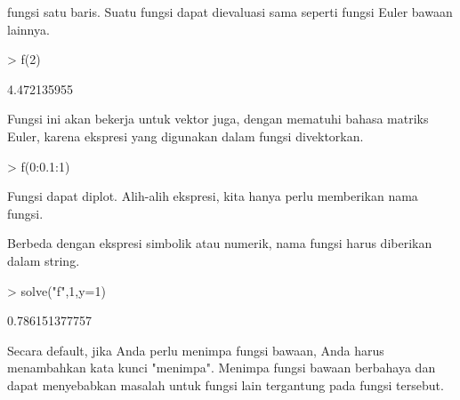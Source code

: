 \documentclass[a4paper,10pt]{article}
\begin{document}
\begin{eulernotebook}
\begin{eulercomment}
\begin{eulercomment}
\begin{eulercomment}
\begin{eulercomment}
\begin{eulercomment}
fungsi satu baris. Suatu fungsi dapat dievaluasi sama seperti fungsi
Euler bawaan lainnya.
\end{eulercomment}
\begin{eulerprompt}
> f(2)
\end{eulerprompt}
\begin{euleroutput}
  4.472135955
\end{euleroutput}
\begin{eulercomment}
Fungsi ini akan bekerja untuk vektor juga, dengan mematuhi bahasa
matriks Euler, karena ekspresi yang digunakan dalam fungsi
divektorkan.
\end{eulercomment}
\begin{eulerprompt}
> f(0:0.1:1)
\end{eulerprompt}
\begin{euleroutput}
  [0,  0.100499,  0.203961,  0.313209,  0.430813,  0.559017,  0.699714,
  0.854459,  1.0245,  1.21083,  1.41421]
\end{euleroutput}
\begin{eulercomment}
Fungsi dapat diplot. Alih-alih ekspresi, kita hanya perlu memberikan
nama fungsi.

Berbeda dengan ekspresi simbolik atau numerik, nama fungsi harus
diberikan dalam string.
\end{eulercomment}
\begin{eulerprompt}
> solve("f",1,y=1)
\end{eulerprompt}
\begin{euleroutput}
  0.786151377757
\end{euleroutput}
\begin{eulercomment}
Secara default, jika Anda perlu menimpa fungsi bawaan, Anda harus
menambahkan kata kunci "menimpa". Menimpa fungsi bawaan berbahaya dan
dapat menyebabkan masalah untuk fungsi lain tergantung pada fungsi
tersebut.


\end{eulercomment}
\end{eulercomment}
\end{eulercomment}
\end{eulercomment}
\end{eulercomment}
\end{eulernotebook}
\end{document}
